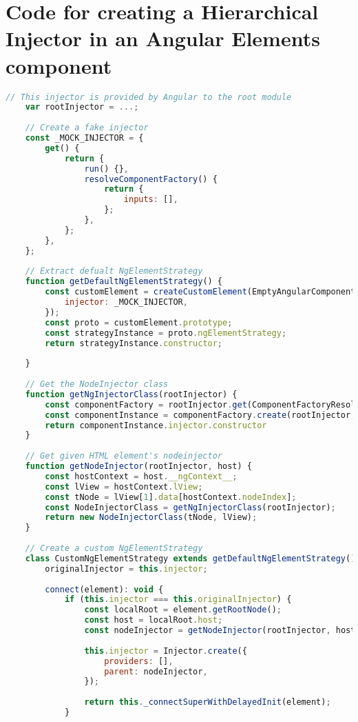 \appendix
\section{Code for creating a Hierarchical Injector in an Angular Elements component}

\begin{lstlisting}[language={JavaScript},caption={The code for creating a Hierarchical Injector in an Angular Elements component},label={lst:appendix:hierarchical-injectors}]
	// This injector is provided by Angular to the root module
	var rootInjector = ...;
	
	// Create a fake injector
	const _MOCK_INJECTOR = {
		get() {
			return {
				run() {},
				resolveComponentFactory() {
					return {
						inputs: [],
					};
				},
			};
		},
	};
	
	// Extract defualt NgElementStrategy
	function getDefaultNgElementStrategy() {
		const customElement = createCustomElement(EmptyAngularComponent, {
			injector: _MOCK_INJECTOR,
		});
		const proto = customElement.prototype;
		const strategyInstance = proto.ngElementStrategy;
		return strategyInstance.constructor;
	
	}
	
	// Get the NodeInjector class
	function getNgInjectorClass(rootInjector) {
		const componentFactory = rootInjector.get(ComponentFactoryResolver).resolveComponentFactory(EmptyAngularComponent);
		const componentInstance = componentFactory.create(rootInjector, []);
		return componentInstance.injector.constructor
	}
	
	// Get given HTML element's nodeinjector
	function getNodeInjector(rootInjector, host) {
		const hostContext = host.__ngContext__;
		const lView = hostContext.lView;
		const tNode = lView[1].data[hostContext.nodeIndex];
		const NodeInjectorClass = getNgInjectorClass(rootInjector);
		return new NodeInjectorClass(tNode, lView);
	}
	
	// Create a custom NgElementStrategy
	class CustomNgElementStrategy extends getDefaultNgElementStrategy() {
		originalInjector = this.injector;
	
		connect(element): void {
			if (this.injector === this.originalInjector) {
				const localRoot = element.getRootNode();
				const host = localRoot.host;
				const nodeInjector = getNodeInjector(rootInjector, host);
	
				this.injector = Injector.create({
					providers: [],
					parent: nodeInjector,
				});
	
				return this._connectSuperWithDelayedInit(element);
			}
	

\end{lstlisting}
